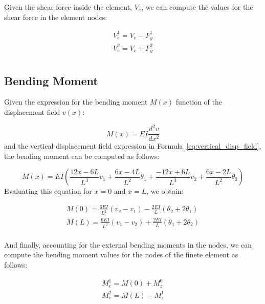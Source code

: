 Given the shear force inside the element, $V_e$, we can compute the values for the shear force in the element nodes:

\[
  \begin{split}
    V_e^1 = V_e - F_y^1 \\
    V_e^2 = V_e + F_y^2 \\
  \end{split}  
\]


\subsection{Bending Moment}

Given the expression for the bending moment $M(x)$ function of the displacement field $v(x)$:

\begin{equation}
  M(x) = EI \frac{d^2v}{dx^2}
\end{equation}
and the vertical displacement field expression in Formula~\ref{eq:vertical_disp_field}, the bending moment can be computed as follows:

\[
  M(x)  = EI \left( \frac{12x - 6L}{L^3} v_1 + \frac{6x - 4L}{L^2} \theta_1 + \frac{-12x + 6L}{L^3} v_2 + \frac{6x - 2L}{L^2} \theta_2 \right)
\]
Evaluating this equation for $x = 0$ and $x = L$, we obtain:

\[
  \begin{split}
    M(0) = \frac{6EI}{L^2} (v_2 - v_1) - \frac{2EI}{L} (\theta_2 + 2 \theta_1) \\
    M(L) = \frac{6EI}{L^2} (v_1 - v_2) + \frac{2EI}{L} (\theta_1 + 2 \theta_2) \\
  \end{split}  
\]

And finally, accounting for the external bending moments in the nodes, we can compute the bending moment values for the nodes of the finete element as follows:

\[
  \begin{split}
    M_e^1 = M(0) + M_z^0 \\
    M_e^2 = M(L) - M_z^1 \\
  \end{split}  
\]

